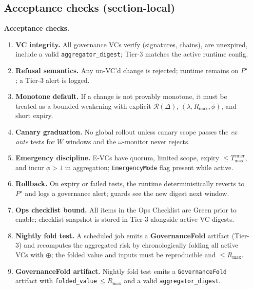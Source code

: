 \documentclass[10pt]{article}
\newenvironment{acceptchecks}{\par\medskip\noindent\textbf{Acceptance checks.}\begin{enumerate}[leftmargin=*]}{\end{enumerate}\medskip}
\newenvironment{acceptchecks}{\begin{mdframed}\textbf{Acceptance checks.}\begin{enumerate}[leftmargin=*]}{\end{enumerate}\end{mdframed}}
\begin{document}
\subsection*{Acceptance checks (section-local)}
\begin{acceptchecks}
  \item \textbf{VC integrity.} All governance VCs verify (signatures, chains), are unexpired, include a valid \texttt{aggregator\_digest}; Tier-3 matches the active runtime config.
  \item \textbf{Refusal semantics.} Any un-VC’d change is rejected; runtime remains on $P^\star$; a Tier-3 alert is logged.
  \item \textbf{Monotone default.} If a change is not provably monotone, it must be treated as a bounded weakening with explicit $\mathcal R(\Delta)$, $(\lambda,R_{\max},\phi)$, and short expiry.
  \item \textbf{Canary graduation.} No global rollout unless canary scope passes the \emph{ex ante} tests for $W$ windows and the $\omega$-monitor never rejects.
  \item \textbf{Emergency discipline.} E-VCs have quorum, limited scope, expiry $\le T_{\mathrm{max}}^{\mathrm{emer}}$, and incur $\phi>1$ in aggregation; \texttt{EmergencyMode} flag present while active.
  \item \textbf{Rollback.} On expiry or failed tests, the runtime deterministically reverts to $P^\star$ and logs a governance alert; guards see the new digest next window.
  \item \textbf{Ops checklist bound.} All items in the Ops Checklist are \textsf{Green} prior to enable; checklist snapshot is stored in Tier-3 alongside active VC digests.
  \item \textbf{Nightly fold test.} A scheduled job emits a \textbf{GovernanceFold} artifact (Tier-3) and recomputes the aggregated risk by chronologically folding all active VCs with $\oplus$; the folded value and inputs must be reproducible and $\le R_{\max}$.
  \item \textbf{GovernanceFold artifact.} Nightly fold test emits a \texttt{GovernanceFold} artifact with \texttt{folded\_value}\,$\le R_{\max}$ and a valid \texttt{aggregator\_digest}.
\end{acceptchecks}

\end{document}
